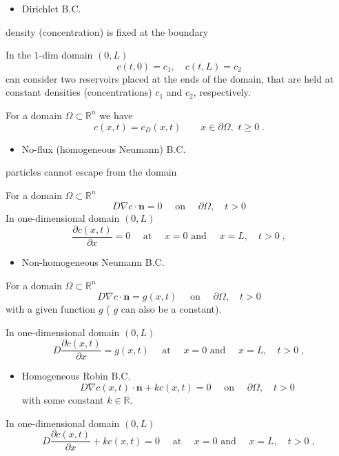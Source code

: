 \documentclass[
  letterpaper,
  DIV=11,
  numbers=noendperiod]{scrreprt}
\providecommand{\tightlist}{%
  \setlength{\itemsep}{0pt}\setlength{\parskip}{0pt}}\usepackage{longtable,booktabs,array}
\theoremstyle{definition}
\theoremstyle{plain}
\theoremstyle{plain}
\theoremstyle{remark}
\begin{document}
\begin{itemize}
\tightlist
\item
  Dirichlet B.C.
\end{itemize}

density (concentration) is fixed at the boundary

In the \(1\)-dim domain \((0,L)\) \[
c(t,0) = c_1, \quad  c(t,L) = c_2
\] can consider two reservoirs placed at the ends of the domain, that
are held at constant densities (concentrations) \(c_1\) and \(c_2\),
respectively.

For a domain \(\Omega\subset \mathbb R^n\) we have \[
c(x,t) = c_D(x,t) \qquad  x\in  \partial \Omega, \, \, t\geq 0 \; .
\]

\begin{itemize}
\tightlist
\item
  No-flux (homogeneous Neumann) B.C.
\end{itemize}

particles cannot escape from the domain

For a domain \(\Omega \subset \mathbb R^n\) \[
D\nabla c  \cdot {\mathbf{n}}  = 0  \quad \text{ on } \quad \partial \Omega, \quad t >0 
\] In one-dimensional domain \((0,L)\) \[
\frac{\partial c(x,t)}{\partial x} = 0 \quad \text{ at } \quad x=0  \text{ and } \quad x= L, \quad t >0 \; , 
\]

\begin{itemize}
\tightlist
\item
  Non-homogeneous Neumann B.C.
\end{itemize}

For a domain \(\Omega \subset \mathbb R^n\) \[
D\nabla c \cdot {\mathbf{n}} = g(x,t)  \quad \text{ on } \quad \partial \Omega, \quad t >0 
\] with a given function \(g\) ( \(g\) can also be a constant).

In one-dimensional domain \((0,L)\) \[
D \frac{\partial c(x,t)}{\partial x} = g(x,t)  \quad \text{ at } \quad x=0  \text{ and } \quad x= L, \quad t >0 \; , 
\]

\begin{itemize}
\tightlist
\item
  Homogeneous Robin B.C. \[
  D\nabla c(x,t)  \cdot {\mathbf{n}}  + k c(x,t)  = 0  \quad \text{ on } \quad \partial \Omega, \quad t >0 
  \] with some constant \(k \in \mathbb R\).
\end{itemize}

In one-dimensional domain \((0,L)\) \[
D \frac{\partial c(x,t)}{\partial x}  + k c(x,t) = 0  \quad \text{ at } \quad x=0  \text{ and } \quad x= L, \quad t >0 \; , 
\]
\end{document}
